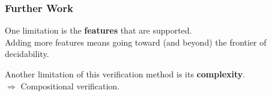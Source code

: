\documentclass{beamer}
\begin{document}

\begin{frame}
  \frametitle{Further Work}
  One limitation is the \textbf{features} that are supported.\\
  Adding more features means going toward (and beyond) the frontier of decidability.

  \vspace{30pt}

  Another limitation of this verification method is its \textbf{complexity}.\\
  $\Rightarrow$ Compositional verification.
\end{frame}

\begin{frame}
  \frametitle{}
  {\tiny
  
  
  }
\end{frame}
\end{document}

